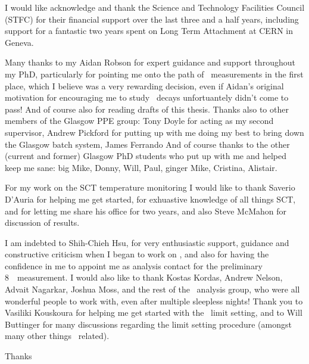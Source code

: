 I would like acknowledge and thank the Science and Technology Facilities Council
(STFC) for their financial support over the last three and a half years,
including support for a fantastic two years spent on Long Term Attachment at CERN
in Geneva.

Many thanks to my Aidan Robson for expert guidance and support throughout my
PhD, particularly for pointing me onto the path of \ZZ\ measurements in the first
place, which I believe was a very rewarding decision, even if Aidan's original
motivation for encouraging me to study \ZZ\ decays unfortuantely didn't come to
pass! And of course also for reading drafts of this thesis. Thanks also to other
members of the Glasgow PPE group: Tony Doyle for acting as my second supervisor,
Andrew Pickford for putting up with me doing my best to bring down the Glasgow
batch system, James Ferrando
And of course thanks to the other (current and former) Glasgow PhD students who put up with me and
helped keep me sane: big Mike, Donny, Will, Paul, ginger Mike, Cristina,
Alistair.

For my work on the SCT temperature monitoring I would like to thank Saverio D'Auria
for helping me get started, for exhuastive knowledge of all things SCT, and for
letting me share his office for two years, and also Steve McMahon for
discussion of results.

I am indebted to Shih-Chieh Hsu, for very enthusiastic
support, guidance and constructive criticism when I began to work on \ZZ, and
also for having the confidence in me to appoint me as analysis contact for the
preliminary 8~\tev\ measurement. I would also like to thank Kostas Kordas,
Andrew Nelson, Advait Nagarkar, Joshua Moss, and the rest of the \ZZ\ analysis
group, who were all wonderful people to work with, even after multiple sleepless
nights! Thank you to Vasiliki Kouskoura for helping me get started with the
\TGC\ limit setting, and to Will Buttinger for many discussions regarding the
limit setting procedure (amongst many other things \ZZ\ related).

Thanks
